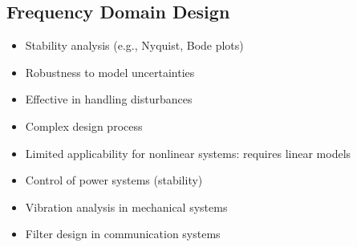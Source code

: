 \subsection{Frequency Domain Design}
\begin{minipage}{0.33\textwidth}
\begin{tcolorbox}[colframe=green!50!black, colback=green!5!white, title=Pros, left=0.5mm, right=0.5mm]
\begin{itemize}[leftmargin=*]
\item Stability analysis (e.g., Nyquist, Bode plots)
\item Robustness to model uncertainties
\item Effective in handling disturbances
\end{itemize}
\end{tcolorbox}
\end{minipage}
\begin{minipage}{0.33\textwidth}
\begin{tcolorbox}[colframe=red!50!black, colback=red!5!white, title=Cons, left=0.5mm, right=0.5mm]
\begin{itemize}[leftmargin=*]
\item Complex design process
\item Limited applicability for nonlinear systems: requires linear models
\end{itemize}
\end{tcolorbox}
\end{minipage}
\begin{minipage}{0.33\textwidth}
\begin{tcolorbox}[colframe=gray!50!black, colback=gray!5!white, title=Examples, left=0.5mm, right=0.5mm]
\begin{itemize}[leftmargin=*]
\item Control of power systems (stability)
\item Vibration analysis in mechanical systems
\item Filter design in communication systems
\end{itemize}
\end{tcolorbox}
\end{minipage}